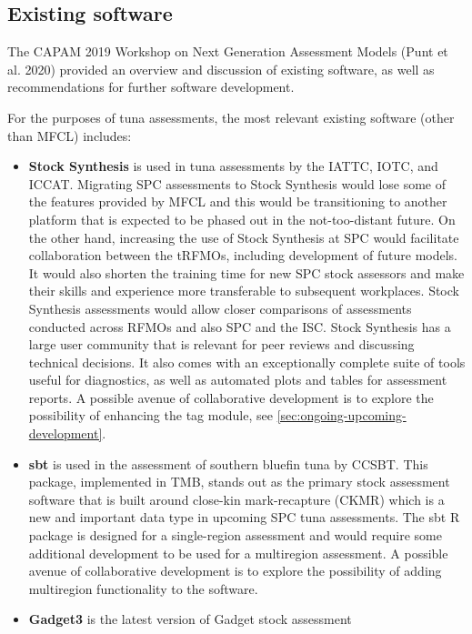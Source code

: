 \documentclass{SCreport}
\begin{document}
\subsection{Existing software}

The CAPAM 2019 Workshop on Next Generation Assessment Models (Punt et al. 2020)
provided an overview and discussion of existing software, as well as
recommendations for further software development.

For the purposes of tuna assessments, the most relevant existing software (other
than MFCL) includes:

\begin{itemize}
  \item \textbf{Stock Synthesis} is used in tuna assessments by the IATTC, IOTC,
  and ICCAT. Migrating SPC assessments to Stock Synthesis would lose some of the
  features provided by MFCL and this would be transitioning to another platform
  that is expected to be phased out in the not-too-distant future. On the other
  hand, increasing the use of Stock Synthesis at SPC would facilitate
  collaboration between the tRFMOs, including development of future models. It
  would also shorten the training time for new SPC stock assessors and make
  their skills and experience more transferable to subsequent workplaces. Stock
  Synthesis assessments would allow closer comparisons of assessments conducted
  across RFMOs and also SPC and the ISC. Stock Synthesis has a large user
  community that is relevant for peer reviews and discussing technical
  decisions. It also comes with an exceptionally complete suite of tools useful
  for diagnostics, as well as automated plots and tables for assessment reports.
  A possible avenue of collaborative development is to explore the possibility
  of enhancing the tag module, see \autoref{sec:ongoing-upcoming-development}.
  \item \textbf{sbt} is used in the assessment of southern bluefin tuna by
  CCSBT. This package, implemented in TMB, stands out as the primary stock
  assessment software that is built around close-kin mark-recapture (CKMR) which
  is a new and important data type in upcoming SPC tuna assessments. The
  \textsf{sbt} R package is designed for a single-region assessment and would
  require some additional development to be used for a multiregion assessment. A
  possible avenue of collaborative development is to explore the possibility of
  adding multiregion functionality to the software.
  \item \textbf{Gadget3} is the latest version of Gadget stock assessment

\end{itemize}
\end{document}

